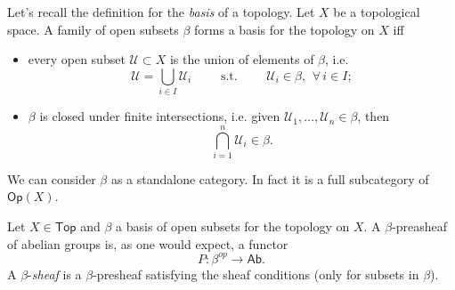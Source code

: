 \documentclass[../Main]{subfiles}
\begin{document}
\begin{defn}
	Let's recall the definition for the {\em basis} of a topology.
	Let $X$ be a topological space. A family of open subsets $\beta$
	forms a basis for the topology on $X$ iff
\begin{itemize}
	\item every open subset $\mathcal{U} \subset X$ is the union of elements of $\beta$,
		i.e.
		\begin{equation}
		\mathcal{U} = \bigcup_{i \in I} \mathcal{U}_i
		\qquad \text{ s.t. } \qquad
		\mathcal{U}_i \in \beta,\ \,\forall\, i \in I
		;\end{equation} 
	\item $\beta$ is closed under finite intersections, i.e.
		given $\mathcal{U}_1, \ldots, \mathcal{U}_n \in \beta$, then
		\begin{equation}
		\bigcap_{i= 1}^n \mathcal{U}_i \in \beta
		.\end{equation} 
\end{itemize} 
\end{defn}

\begin{rem}
We can consider $\beta$ as a standalone category.
In fact it is a full subcategory of $\mathsf{Op}(X)$.
\end{rem}

\begin{defn}
Let $X \in \mathsf{Top}$ and $\beta$ a basis of open subsets for the topology on $X$.
A $\beta$-preasheaf of abelian groups is, as one would expect, a functor
\begin{equation}
P\colon \beta^{op} \to \mathsf{Ab}
.\end{equation} 
A $\beta$-{\em sheaf} is a $\beta$-presheaf satisfying the sheaf conditions
(only for subsets in $\beta$).
\end{defn}
\end{document}
